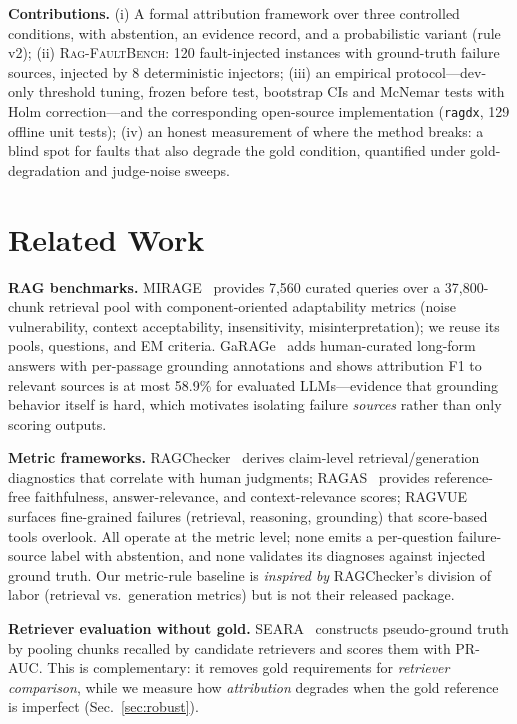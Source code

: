 \documentclass[conference]{IEEEtran}
\begin{document}
\textbf{Contributions.} (i) A formal attribution framework over three
controlled conditions, with abstention, an evidence record, and a
probabilistic variant (rule v2); (ii) \textsc{Rag-FaultBench}: 120
fault-injected instances with ground-truth failure sources, injected by 8
deterministic injectors; (iii) an empirical protocol---dev-only threshold
tuning, frozen before test, bootstrap CIs and McNemar tests with Holm
correction---and the corresponding open-source implementation
(\texttt{ragdx}, 129 offline unit tests); (iv) an honest measurement of where
the method breaks: a blind spot for faults that also degrade the gold
condition, quantified under gold-degradation and judge-noise sweeps.

\section{Related Work}
\textbf{RAG benchmarks.} MIRAGE~\cite{park2025mirage} provides 7,560
curated queries over a 37,800-chunk retrieval pool with component-oriented
adaptability metrics (noise vulnerability, context acceptability,
insensitivity, misinterpretation); we reuse its pools, questions, and EM
criteria. GaRAGe~\cite{sorodoc2025garage} adds human-curated long-form
answers with per-passage grounding annotations and shows attribution F1 to
relevant sources is at most 58.9\% for evaluated LLMs---evidence that
grounding behavior itself is hard, which motivates isolating failure
\emph{sources} rather than only scoring outputs.

\textbf{Metric frameworks.} RAGChecker~\cite{ru2024ragchecker} derives
claim-level retrieval/generation diagnostics that correlate with human
judgments; RAGAS~\cite{es2024ragas} provides reference-free faithfulness,
answer-relevance, and context-relevance scores; RAGVUE~\cite{murugaraj2026ragvue}
surfaces fine-grained failures (retrieval, reasoning, grounding) that
score-based tools overlook. All operate at the metric level; none emits a
per-question failure-source label with abstention, and none validates its
diagnoses against injected ground truth. Our metric-rule baseline is
\emph{inspired by} RAGChecker's division of labor (retrieval vs.\ generation
metrics) but is not their released package.

\textbf{Retriever evaluation without gold.} SEARA~\cite{zou2025seara}
constructs pseudo-ground truth by pooling chunks recalled by candidate
retrievers and scores them with PR-AUC. This is complementary: it removes
gold requirements for \emph{retriever comparison}, while we measure how
\emph{attribution} degrades when the gold reference is imperfect
(Sec.~\ref{sec:robust}).
\end{document}
